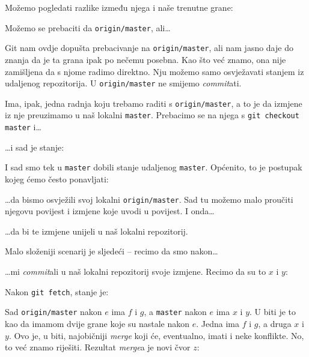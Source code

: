 Možemo pogledati razlike između njega i naše trenutne grane:


Možemo se prebaciti da \verb+origin/master+, ali\dots



Git nam ovdje dopušta prebacivanje na \verb+origin/master+, ali nam jasno daje do znanja da je ta grana ipak po nečemu posebna.
Kao što već znamo, ona nije zamišljena da s njome radimo direktno.
Nju možemo samo osvježavati stanjem iz udaljenog repozitorija.
U \verb+origin/master+ ne smijemo \emph{commit}ati.

Ima, ipak, jedna radnja koju trebamo raditi s \verb+origin/master+, a to je da izmjene iz nje preuzimamo u naš lokalni \verb+master+.
Prebacimo se na njega s \verb+git checkout master+ i\dots{}


\dots{}i sad je stanje:



I sad smo tek u \verb+master+ dobili stanje udaljenog \verb+master+.
Općenito, to je postupak kojeg ćemo često ponavljati:


\dots{}da bismo osvježili svoj lokalni \verb+origin/master+.
Sad tu možemo malo proučiti njegovu povijest i izmjene koje uvodi u povijest.
I onda\dots


\dots{}da bi te izmjene unijeli u naš lokalni repozitorij.

Malo složeniji scenarij je sljedeći -- recimo da smo nakon\dots{}



\dots{}mi \emph{commit}ali u naš lokalni repozitorij svoje izmjene. Recimo da su to $x$ i $y$:



Nakon \verb+git fetch+, stanje je:



Sad \verb+origin/master+ nakon $e$ ima $f$ i $g$, a \verb+master+ nakon $e$ ima $x$ i $y$.
U biti je to kao da imamom dvije grane koje su nastale nakon $e$. Jedna ima $f$ i $g$, a druga $x$ i $y$.
Ovo je, u biti, najobičniji \emph{merge} koji će, eventualno, imati i neke konflikte. 
No, to već znamo riješiti.
Rezultat \emph{merge}a je novi čvor $z$:

